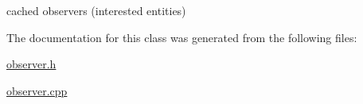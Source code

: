 cached observers (interested entities) 

The documentation for this class was generated from the following files\-:\begin{DoxyCompactItemize}
\item 
\hyperlink{observer_8h}{observer.\-h}\item 
\hyperlink{observer_8cpp}{observer.\-cpp}\end{DoxyCompactItemize}
